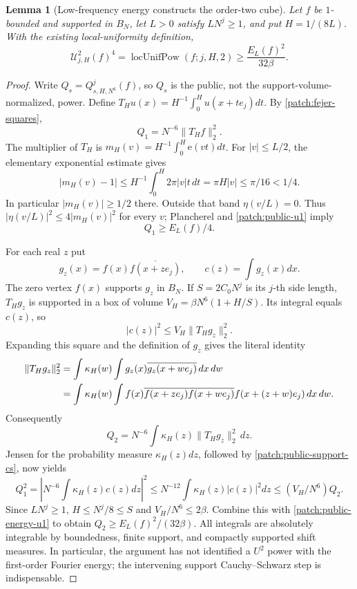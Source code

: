 \documentclass[11pt]{article}
\newtheorem{lemma}[lemma]{Lemma}
\theoremstyle{definition}
\newcommand{\ee}[1]{\mathrm e\!\left(#1\right)}
\begin{document}
\begin{lemma}[Low-frequency energy constructs the order-two cube]
\label{patch:energy-to-u2}
Let $f$ be $1$-bounded and supported in $B_N$, let $L>0$ satisfy $LN^j\geq1$, and put
$H=1/(8L)$.  With the \emph{existing} local-uniformity definition,
\begin{equation}\label{patch:energy-u2-quantitative}
 \mathcal U^2_{j,H}(f)^4
   =\operatorname{locUnifPow}(f;j,H,2)
   \geq\frac{E_L(f)^2}{32\beta}.
\end{equation}
\end{lemma}
\begin{proof}
Write $Q_s=Q_{s,H,N^6}^j(f)$, so $Q_s$ is the public, not the support-volume-normalized,
power.  Define $T_Hu(x)=H^{-1}\int_0^H u(x+te_j)dt$.
By \cref{patch:fejer-squares},
\begin{equation}\label{patch:public-u1}
 Q_1=N^{-6}\|T_Hf\|_2^2.
\end{equation}
The multiplier of $T_H$ is $m_H(v)=H^{-1}\int_0^H\ee{vt}dt$.
For $|v|\leq L/2$, the elementary exponential estimate gives
\[
 |m_H(v)-1|\leq H^{-1}\int_0^H2\pi|v|t\,dt
                  =\pi H|v|\leq\pi/16<1/4.
\]
In particular $|m_H(v)|\geq1/2$ there.  Outside that band $\eta(v/L)=0$.
Thus $|\eta(v/L)|^2\leq4|m_H(v)|^2$ for every $v$; Plancherel and
\eqref{patch:public-u1} imply
\begin{equation}\label{patch:public-energy-u1}
 Q_1\geq E_L(f)/4.
\end{equation}

For each real $z$ put
\[
 g_z(x)=f(x)\overline{f(x+ze_j)},\qquad c(z)=\int g_z(x)dx.
\]
The zero vertex $f(x)$ supports $g_z$ in $B_N$.
If $S=2C_0N^j$ is its $j$-th side length, $T_Hg_z$ is supported in a box of volume
$V_H=\beta N^6(1+H/S)$.  Its integral equals $c(z)$, so
\begin{equation}\label{patch:public-support-cs}
 |c(z)|^2\leq V_H\|T_Hg_z\|_2^2.
\end{equation}
Expanding this square and the definition of $g_z$ gives the literal identity
\begin{align}
 \|T_Hg_z\|_2^2
 &=\int\kappa_H(w)\int g_z(x)\overline{g_z(x+we_j)}\,dx\,dw\notag\\
 &=\int\kappa_H(w)\int
 f(x)\overline{f(x+ze_j)}\overline{f(x+we_j)}
                  f(x+(z+w)e_j)\,dx\,dw.\label{patch:public-literal-cube}
\end{align}
Consequently
\begin{equation}\label{patch:public-u2-squares}
 Q_2=N^{-6}\int\kappa_H(z)\|T_Hg_z\|_2^2\,dz.
\end{equation}
Jensen for the probability measure $\kappa_H(z)dz$, followed by
\eqref{patch:public-support-cs}, now yields
\[
 Q_1^2=\left|N^{-6}\int\kappa_H(z)c(z)dz\right|^2
 \leq N^{-12}\int\kappa_H(z)|c(z)|^2dz
 \leq (V_H/N^6)Q_2.
\]
Since $LN^j\geq1$, $H\leq N^j/8\leq S$ and $V_H/N^6\leq2\beta$.
Combine this with \eqref{patch:public-energy-u1} to obtain
$Q_2\geq E_L(f)^2/(32\beta)$.
All integrals are absolutely integrable by boundedness, finite support, and compactly supported
shift measures.  In particular, the argument has not identified a $U^2$ power with the
first-order Fourier energy; the intervening support Cauchy--Schwarz step is indispensable.
\end{proof}
\end{document}
